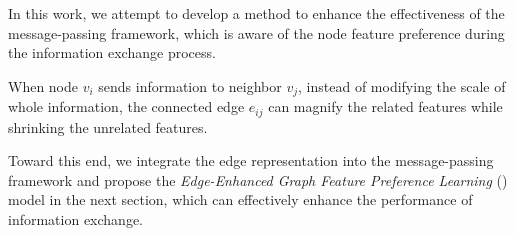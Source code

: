 In this work, we attempt to develop a method to enhance the effectiveness of the message-passing framework, which is aware of the node feature preference during the information exchange process.

\begin{definition}
    When node $v_{i}$ sends information to neighbor $v_{j}$, instead of modifying the scale of whole information, the connected edge $e_{ij}$ can magnify the related features while shrinking the unrelated features.
\end{definition}

Toward this end, we integrate the edge representation into the message-passing framework and propose the \emph{Edge-Enhanced Graph Feature Preference Learning} (\alg) model in the next section, which can effectively enhance the performance of information exchange.






